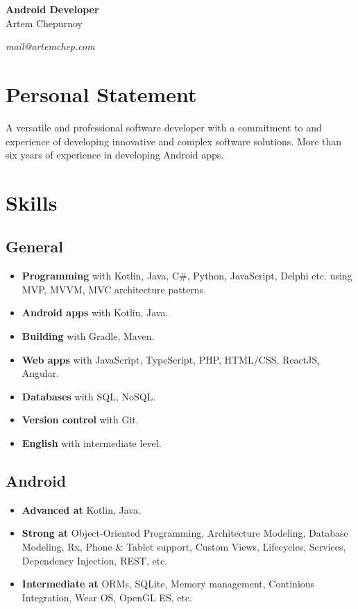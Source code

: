 \documentclass[a4paper]{article}
\begin{document}
	\begin{center}
		{\huge\bfseries Android Developer} \\[1em]
		{\Large Artem Chepurnoy} \\[1em]
		\faMapMarker \quad \myaddress
	\end{center}
	\vspace{1em}
	\textit{\faPaperPlane \quad mail@artemchep.com} \hspace*{\fill} \textit{\faPhone \quad \myphone} 

	\section*{Personal Statement}
	A versatile and professional software developer with a commitment to and experience of developing innovative and complex software solutions. 
	More than six years of experience in developing Android apps.

	\section*{Skills}
	\subsection*{General}
	\begin{multicols}{2}
	\begin{itemize}
		\item \textbf{Programming} with Kotlin, Java, C\#, Python, JavaScript, Delphi etc. using MVP, MVVM, MVC architecture patterns.
		\item \textbf{Android apps} with Kotlin, Java.
		\item \textbf{Building} with Gradle, Maven.
		\item \textbf{Web apps} with JavaScript, TypeScript, PHP, HTML/CSS, ReactJS, Angular.
		\item \textbf{Databases} with SQL, NoSQL.
		\item \textbf{Version control} with Git.
		\item \textbf{English} with intermediate level.
	\end{itemize}
	\end{multicols}
	\subsection*{Android}
	\begin{multicols}{2}
	\begin{itemize}
		\item \textbf{Advanced at} Kotlin, Java.
		\item \textbf{Strong at} Object-Oriented Programming, Architecture Modeling, Database Modeling, Rx, Phone \& Tablet support, Custom Views, Lifecycles, Services, Dependency Injection, REST, etc.
		\item \textbf{Intermediate at} ORMs, SQLite, Memory management, Continious Integration, Wear OS, OpenGL ES, etc.
	\end{itemize}
	\end{multicols}
\end{document}

